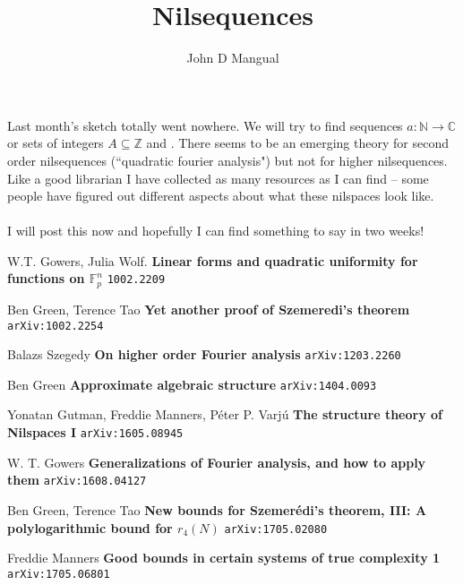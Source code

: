 \documentclass[12pt]{article}
\title{Nilsequences}
\author{John D Mangual}
\date{}
\begin{document}
\selectfont \fontsize{12.5}{15}\selectfont

\maketitle

\noindent Last month's sketch totally went nowhere. We will try to find sequences $a: \mathbb{N} \to \mathbb{C}$ or sets of integers $A \subseteq \mathbb{Z}$ and .  There seems to be an emerging theory for second order nilsequences (``quadratic fourier analysis") but not for higher nilsequences.  Like a good librarian I have collected as many resources as I can find -- some people have figured out different aspects about what these nilspaces look like. \\ \\
I will post this now and hopefully I can find something to say in two weeks!  
 
\vfill


\noindent 

\begin{thebibliography}{}

\item W.T. Gowers, Julia Wolf.  \textbf{Linear forms and quadratic uniformity for functions on $\mathbb{F}_p^n$} \texttt{1002.2209}

\item Ben Green, Terence Tao \textbf{Yet another proof of Szemeredi's theorem} \texttt{arXiv:1002.2254}

\item Balazs Szegedy \textbf{On higher order Fourier analysis} \texttt{arXiv:1203.2260}

\item Ben Green \textbf{Approximate algebraic structure} \texttt{arXiv:1404.0093}

\item Yonatan Gutman, Freddie Manners, P\'{e}ter P. Varj\'{u} \textbf{The structure theory of Nilspaces I} \texttt{arXiv:1605.08945}

\item W. T. Gowers \textbf{Generalizations of Fourier analysis, and how to apply them} \texttt{arXiv:1608.04127}

\item Ben Green, Terence Tao \textbf{New bounds for Szemer\'{e}di's theorem, III: A polylogarithmic bound for $r_4(N)$} \texttt{arXiv:1705.02080}

\item Freddie Manners \textbf{Good bounds in certain systems of true complexity 1} \texttt{arXiv:1705.06801}


\end{thebibliography}

\end{document}
